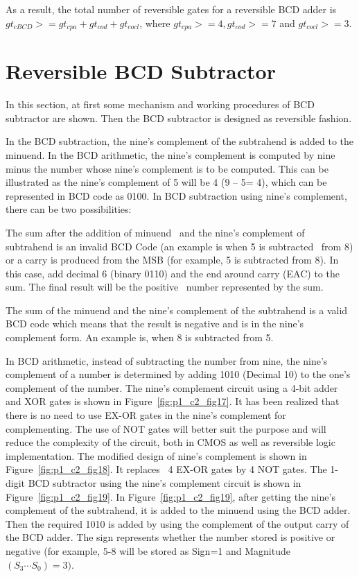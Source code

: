 As a result, the total number of reversible gates for a reversible BCD adder is $gt{}_{cBCD}{>} = gt{}_{cpa} + gt{}_{cod} + gt{}_{cocl}$, where $gt{}_{cpa}{>} = 4, gt{}_{cod}{>}= 7$ and $gt{}_{cocl}{>} = 3$.

\section{Reversible BCD Subtractor}
In this section, at first some mechanism and working procedures of BCD subtractor are shown. Then the BCD subtractor is designed as reversible fashion. %

In the BCD subtraction, the nine's complement of the subtrahend is added to the minuend. In the BCD arithmetic, the nine's complement is computed by nine minus the number whose nine's complement is to be computed. This can be illustrated as the nine's complement of 5 will be 4 (9 -- 5= 4), which can be represented in BCD code as 0100. In BCD subtraction using nine's complement, there can be two possibilities:

The sum after the addition of minuend~ and the nine's complement of subtrahend is an invalid BCD Code (an example is when 5 is subtracted~ from 8) or a carry is produced from the MSB (for example, 5 is subtracted from 8). In this case, add decimal 6 (binary 0110) and the end around carry (EAC) to the sum. The final result will be the positive~ number represented by the sum.

The sum of the minuend and the nine's complement of the subtrahend is a valid BCD code which means that the result is negative and is in the nine's complement form. An example is, when 8 is subtracted from 5.

In BCD arithmetic, instead of subtracting the number from nine, the nine's complement of a number is determined by adding 1010 (Decimal 10) to the one's complement of the number. The nine's complement circuit using a 4-bit adder and XOR gates is shown in Figure~\ref{fig:p1_c2_fig17}. It has been realized that there is no need to use EX-OR gates in the nine's complement for complementing. The use of NOT gates will better suit the purpose and will reduce the complexity of the circuit, both in CMOS as well as reversible logic implementation. The modified design of nine's complement is shown in Figure~\ref{fig:p1_c2_fig18}. It replaces~ 4 EX-OR gates by 4 NOT gates. The 1-digit BCD subtractor using the nine's complement circuit is shown in Figure~\ref{fig:p1_c2_fig19}. In Figure~\ref{fig:p1_c2_fig19}, after getting the nine's complement of the subtrahend, it is added to the minuend using the BCD adder. Then the required 1010 is added by using the complement of the output carry of the BCD adder. The sign represents whether the number stored is positive or negative (for example, 5-8 will be stored as Sign=1 and Magnitude $(S_3 \cdots S_0) = 3)$.

